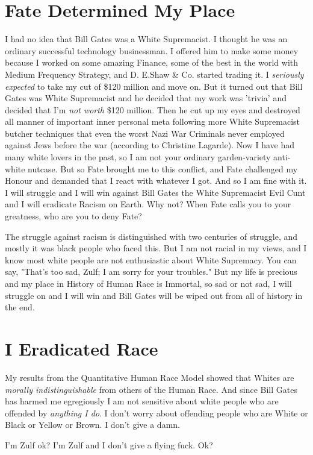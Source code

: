 \documentclass{amsart}
\author{Zulfikar Moinuddin Ahmed}
\date{\today}
\begin{document}
\maketitle

\section{Fate Determined My Place}

I had no idea that Bill Gates was a White Supremacist.  I thought he was an ordinary successful technology businessman.  I offered him to make some money because I worked on some amazing Finance, some of the best in the world with Medium Frequency Strategy, and D. E.Shaw \& Co. started trading it.  I {\em seriously expected} to take my cut of \$120 million and move on.  But it turned out that Bill Gates was White Supremacist and he decided that my work was 'trivia' and decided that I'm {\em not worth} \$120 million.  Then he cut up my eyes and destroyed all manner of important inner personal meta following more White Supremacist butcher techniques that even the worst Nazi War Criminals never employed against Jews before the war (according to Christine Lagarde).  Now I have had many white lovers in the past, so I am not your ordinary garden-variety anti-white nutcase.  But so Fate brought me to this conflict, and Fate challenged my Honour and demanded that I react with whatever I got.  And so I am fine with it.  I will struggle and I will win against Bill Gates the White Supremacist Evil Cunt and I will eradicate Racism on Earth.  Why not?  When Fate calls you to your greatness, who are you to deny Fate?

The struggle against racism is distinguished with two centuries of struggle, and mostly it was black people who faced this.  But I am not racial in my views, and I know most white people are not enthusiastic about White Supremacy.  You can say, "That's too sad, Zulf; I am sorry for your troubles."  But my life is precious and my place in History of Human Race is Immortal, so sad or not sad, I will struggle on and I will win and Bill Gates will be wiped out from all of history in the end.  

\section{I Eradicated Race}

My results from the Quantitative Human Race Model showed that Whites are {\em morally indistinguishable} from others of the Human Race.  And since Bill Gates has harmed me egregiously I am not sensitive about white people who are offended by {\em anything I do}.  I don't worry about offending people who are White or Black or Yellow or Brown.  I don't give a damn.

I'm Zulf ok?  I'm Zulf and I don't give a flying fuck.  Ok?
\end{document}
